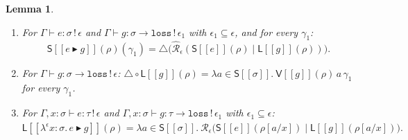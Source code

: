 \documentclass[11pt]{article}
\theoremstyle{plain}
\newtheorem{lemma}[theorem]{Lemma}
\newcommand{\Ssem}[1]{\mathsf{S}[\![#1]\!]}
\newcommand{\Lsem}[1]{\mathsf{L}[\![#1]\!]}
\newcommand{\Vsem}[1]{\mathsf{V}[\![#1]\!]}
\newcommand{\eps}{\epsilon}
\newcommand{\then}{\mathrel{\blacktriangleright}}
\newcommand{\collect}{\triangle}
\newcommand{\Rx}[1]{\widehat{\mathcal R}_{#1}}
\begin{document}
\begin{lemma}\
\begin{enumerate}[label=(\arabic*)]
\item For $\Gamma\vdash e:\sigma\,!\,\eps$ and $\Gamma\vdash g:\sigma\to\mathtt{loss}\,!\,\eps_1$
  with $\eps_1\subseteq\eps$, and for every $\gamma_1$:
  \[
    \Ssem{e\then g}(\rho)(\gamma_1) = \collect\big(\Rx\eps(\Ssem{e}(\rho)\mid\Lsem{g}(\rho))\big).
  \]
\item For $\Gamma\vdash g:\sigma\to\mathtt{loss}\,!\,\eps$:
  $\collect\circ\Lsem{g}(\rho) = \lambda a\in\Ssem\sigma.\ \Vsem{g}(\rho)\,a\,\gamma_1$ for every $\gamma_1$.
\item For $\Gamma,x{:}\sigma\vdash e:\tau\,!\,\eps$ and $\Gamma,x{:}\sigma\vdash g:\tau\to\mathtt{loss}\,!\,\eps_1$
  with $\eps_1\subseteq\eps$:
  \[
    \Lsem{\lambda^\eps x{:}\sigma.\,e\then g}(\rho) = \lambda a\in\Ssem\sigma.\ \Rx\eps\big(\Ssem{e}(\rho[a/x])\mid\Lsem{g}(\rho[a/x])\big).
  \]
\end{enumerate}
\end{lemma}
\end{document}

